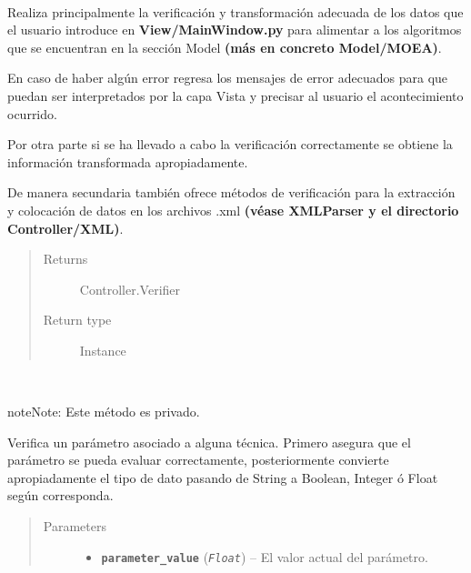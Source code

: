 \documentclass[letterpaper,10pt,english]{sphinxmanual}
\begin{document}
\begin{fulllineitems}
\label{Controller/Verifier:Controller.Verifier.Verifier}~
\begin{DUlineblock}{0em}
\item[] Realiza principalmente la verificación y transformación adecuada de los datos 
que el usuario introduce en \textbf{View/MainWindow.py} para alimentar a los algoritmos 
que se encuentran en la sección Model \textbf{(más en concreto Model/MOEA)}.
\item[] 
\item[] En caso de haber algún error regresa los mensajes de error adecuados para que puedan
ser interpretados por la capa Vista y precisar al usuario el acontecimiento ocurrido.
\item[] 
\item[] Por otra parte si se ha llevado a cabo la verificación correctamente se obtiene la información
transformada apropiadamente.
\item[] 
\item[] De manera secundaria también ofrece métodos de verificación para la extracción
y colocación de datos en los archivos .xml \textbf{(véase XMLParser y el directorio Controller/XML)}.
\end{DUlineblock}
\begin{quote}\begin{description}
\item[{Returns}] \leavevmode
Controller.Verifier

\item[{Return type}] \leavevmode
Instance

\end{description}\end{quote}

\begin{fulllineitems}
\label{Controller/Verifier:Controller.Verifier.Verifier._Verifier__cast_parameter}~
\begin{notice}{note}{Note:}
Este método es privado.
\end{notice}

Verifica un parámetro asociado a alguna técnica.
Primero asegura que el parámetro se pueda evaluar correctamente,
posteriormente convierte apropiadamente el tipo de dato pasando 
de String a Boolean, Integer ó Float según corresponda.
\begin{quote}\begin{description}
\item[{Parameters}] \leavevmode\begin{itemize}
\item {} 
\textbf{\texttt{parameter\_value}} (\emph{\texttt{Float}}) -- El valor actual del parámetro.


\end{itemize}
\end{description}
\end{quote}
\end{fulllineitems}
\end{fulllineitems}
\end{document}
